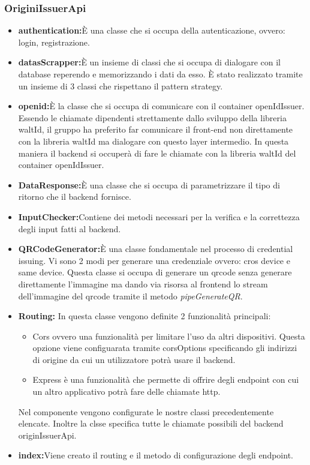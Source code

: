 \subsubsection{OriginiIssuerApi}
\begin{itemize}
    \item \textbf{authentication:}È una classe che si occupa della autenticazione, ovvero: login, registrazione. 
    \item \textbf{datasScrapper:}È un insieme di classi che si occupa di dialogare con il database reperendo e memorizzando i dati da esso. È stato realizzato tramite un insieme di 3 classi che rispettano il pattern strategy. 
    \item \textbf{openid:}È la classe che si occupa di comunicare con il container openIdIssuer. Essendo le chiamate dipendenti strettamente dallo sviluppo della libreria waltId, il gruppo ha preferito far comunicare il front-end non direttamente con la libreria waltId ma dialogare con questo layer intermedio. In questa maniera il backend si occuperà di fare le chiamate con la libreria waltId del container openIdIssuer.
    \item \textbf{DataResponse:}È una classe che si occupa di parametrizzare il tipo di ritorno che il backend fornisce.
    \item \textbf{InputChecker:}Contiene dei metodi necessari per la verifica e la correttezza degli input fatti al backend.
    \item \textbf{QRCodeGenerator:}È una classe fondamentale nel processo di credential issuing. Vi sono 2 modi per generare una credenziale ovvero: cros device e same device. Questa classe si occupa di generare un qrcode senza generare direttamente l'immagine ma dando via risorsa al frontend lo stream dell'immagine del qrcode tramite il metodo \textit{pipeGenerateQR}.
    \item \textbf{Routing:} In questa classe vengono definite 2 funzionalità principali:
     \begin{itemize}
     \item Cors ovvero una funzionalità per limitare l'uso da altri dispositivi. Questa opzione viene configuarata tramite corsOptions specificando gli indirizzi di origine da cui un utilizzatore potrà usare il backend. 
     \item Express è una funzionalità che permette di offrire degli endpoint con cui un altro applicativo potrà fare delle chiamate http. 
     \end{itemize}
    Nel componente vengono configurate le nostre classi precedentemente elencate.
    Inoltre la clsse specifica tutte le chiamate possibili del backend originIssuerApi.

    
    \item \textbf{index:}Viene creato il routing e il metodo di configurazione degli endpoint.
\end{itemize}
